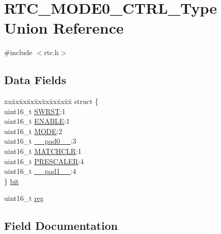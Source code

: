 \hypertarget{union_r_t_c___m_o_d_e0___c_t_r_l___type}{}\section{R\+T\+C\+\_\+\+M\+O\+D\+E0\+\_\+\+C\+T\+R\+L\+\_\+\+Type Union Reference}
\label{union_r_t_c___m_o_d_e0___c_t_r_l___type}


{\ttfamily \#include $<$rtc.\+h$>$}

\subsection*{Data Fields}
\begin{DoxyCompactItemize}
\item 
\begin{tabbing}
xx\=xx\=xx\=xx\=xx\=xx\=xx\=xx\=xx\=\kill
struct \{\\
\>uint16\_t \mbox{\hyperlink{union_r_t_c___m_o_d_e0___c_t_r_l___type_a4987fcca11694bd2ffae6a773a9bfc24}{SWRST}}:1\\
\>uint16\_t \mbox{\hyperlink{union_r_t_c___m_o_d_e0___c_t_r_l___type_aec203800ebef356dc04f3e8986a824d8}{ENABLE}}:1\\
\>uint16\_t \mbox{\hyperlink{union_r_t_c___m_o_d_e0___c_t_r_l___type_abd348ee828aadd0781f3fa97d167e564}{MODE}}:2\\
\>uint16\_t \mbox{\hyperlink{union_r_t_c___m_o_d_e0___c_t_r_l___type_a77132c2c26a75f5b8751b235cda23828}{\_\_pad0\_\_}}:3\\
\>uint16\_t \mbox{\hyperlink{union_r_t_c___m_o_d_e0___c_t_r_l___type_a65c02be208134a4798cf1e0e5c5b6c27}{MATCHCLR}}:1\\
\>uint16\_t \mbox{\hyperlink{union_r_t_c___m_o_d_e0___c_t_r_l___type_a30db59a1afd851a8a4acd5d8605ca6ba}{PRESCALER}}:4\\
\>uint16\_t \mbox{\hyperlink{union_r_t_c___m_o_d_e0___c_t_r_l___type_ab72e3a1f2f7db8695c60c658f5a0f11a}{\_\_pad1\_\_}}:4\\
\} \mbox{\hyperlink{union_r_t_c___m_o_d_e0___c_t_r_l___type_aee9a611f5ad50d4ecaa801bc554535c3}{bit}}\\

\end{tabbing}\item 
uint16\+\_\+t \mbox{\hyperlink{union_r_t_c___m_o_d_e0___c_t_r_l___type_a11760f5020019f4aa8cb02e694f7cc44}{reg}}
\end{DoxyCompactItemize}


\subsection{Field Documentation}
\mbox{\label{union_r_t_c___m_o_d_e0___c_t_r_l___type_a77132c2c26a75f5b8751b235cda23828}} 
